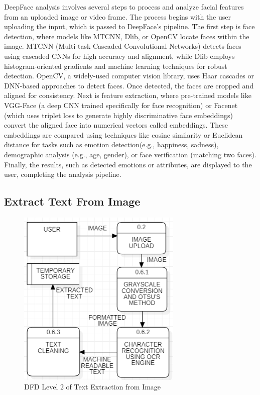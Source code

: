 \noindent
DeepFace analysis involves several steps to process and analyze facial features from an uploaded image or video frame. The process begins with the user uploading the input, which is passed to DeepFace’s pipeline. The first step is face detection, where models like MTCNN, Dlib, or OpenCV locate faces within the image. MTCNN (Multi-task Cascaded Convolutional Networks) detects faces using cascaded CNNs for high accuracy and alignment, while Dlib employs histogram-oriented gradients and machine learning techniques for robust detection. OpenCV, a widely-used computer vision library, uses Haar cascades or DNN-based approaches to detect faces. Once detected, the faces are cropped and aligned for consistency. Next is feature extraction, where pre-trained models like VGG-Face (a deep CNN trained specifically for face recognition) or Facenet (which uses triplet loss to generate highly discriminative face embeddings) convert the aligned face into numerical vectors called embeddings. These embeddings are compared using techniques like cosine similarity or Euclidean distance for tasks such as emotion detection(e.g., happiness, sadness), demographic analysis (e.g., age, gender), or face verification (matching two faces). Finally, the results, such as detected emotions or attributes, are displayed to the user, completing the analysis pipeline.


\subsection{Extract Text From Image}

\begin{figure}[h!]  
    \centering
    \includegraphics[width=0.7\textwidth]{Images/DFD L2 TEXT EXTRACT.png}  
    \caption{DFD Level 2 of Text Extraction from Image}
    \label{dfdl13456}  %
\end{figure}

